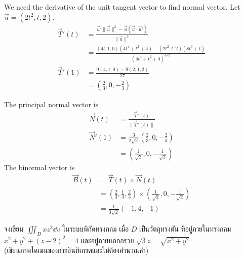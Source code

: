 \documentclass[12pt,final]{novelette} %
\begin{document}
\begin{question}
\begin{question}
        We need the derivative of the unit tangent vector to find normal vector. Let $\vec{u} = (2t^2, t, 2)$.
        \begin{align*}
            \vec{T}'(t) & = \frac{\vec{u}'\lVert \vec{u} \rVert^2 - \vec{u} (\vec{u} \cdot \vec{u}')}{\lVert \vec{u} \rVert^3} \\
                        & = \frac{(4t, 1, 0)(4t^4 + t^2 + 4) - (2t^2, t, 2)(8t^3 + t)}{(4t^4 + t^2 + 4)^{3/2}}                 \\
            \vec{T}'(1) & = \frac{9(4, 1, 0) - 9(2, 1, 2)}{27}                                                                 \\
                        & = \left(\frac23, 0, -\frac23\right)
        \end{align*}

        The principal normal vector is
        \begin{align*}
            \vec{N}(t)  & = \frac{\vec{T}'(t)}{\lVert \vec{T}'(t) \rVert}               \\
            \vec{N}'(1) & = \frac{3}{2\sqrt2} \left(\frac23, 0, -\frac23\right)         \\
                        & = \boxed{\left(\frac{1}{\sqrt2}, 0, -\frac{1}{\sqrt2}\right)}
        \end{align*}
        The binormal vector is
        \begin{align*}
            \vec{B}(t) & = \vec{T}(t) \times \vec{N}(t)                                                                      \\
                       & = \left(\frac23, \frac13, \frac23\right) \times \left(\frac{1}{\sqrt2}, 0, -\frac{1}{\sqrt2}\right) \\
                       & = \boxed{\frac{1}{3\sqrt2}\left(-1, 4, -1\right)}
        \end{align*}
    \end{question}

    \item {}
    \begin{question}
        \item
        จงเขียน $\iiint_D xz^2 \dd{v}$ ในระบบพิกัดทรงกลม เมื่อ $D$ เป็นวัตถุทรงตัน ที่อยู่ภายในทรงกลม \\
        $x^2 + y^2 + (z-2)^2 = 4$
        และอยู่ภายนอกกรวย $\sqrt3 z = \sqrt{x^2 + y^2}$ \\
        (เขียนภาพโดเมนของการอินทิเกรตและไม่ต้องคำนวณค่า) 


\end{question}
\end{question}
\end{document}
